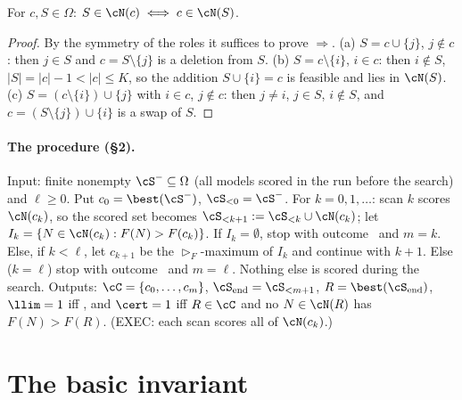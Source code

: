 \documentclass[11pt]{report}
\begin{document}
\begin{T20lemma}[symmetry]\label{T20:lem:sym}
For $c,S\in\Omega$: $S\in\cN(c)\iff c\in\cN(S)$.
\end{T20lemma}
\begin{proof}
By the symmetry of the roles it suffices to prove $\Rightarrow$. (a) $S=c\cup\{j\}$, $j\notin c$: then $j\in S$ and $c=S\setminus\{j\}$ is a deletion from $S$. (b) $S=c\setminus\{i\}$, $i\in c$: then $i\notin S$, $|S|=|c|-1<|c|\le K$, so the addition $S\cup\{i\}=c$ is feasible and lies in $\cN(S)$. (c) $S=(c\setminus\{i\})\cup\{j\}$ with $i\in c$, $j\notin c$: then $j\ne i$, $j\in S$, $i\notin S$, and $c=(S\setminus\{j\})\cup\{i\}$ is a swap of $S$.
\end{proof}

\paragraph{The procedure (\S2).} Input: finite nonempty $\cS^-\subseteq\Omega$ (all models scored in the run before the search) and $\ell\ge0$. Put $c_0=\best(\cS^-)$, $\cS_{<0}=\cS^-$. For $k=0,1,\dots$: scan $k$ scores $\cN(c_k)$, so the scored set becomes $\cS_{<k+1}:=\cS_{<k}\cup\cN(c_k)$; let $I_k=\{N\in\cN(c_k):F(N)>F(c_k)\}$. If $I_k=\emptyset$, stop with outcome \NOIMP\ and $m=k$. Else, if $k<\ell$, let $c_{k+1}$ be the $\rhd_F$-maximum of $I_k$ and continue with $k+1$. Else ($k=\ell$) stop with outcome \LIMIT\ and $m=\ell$. Nothing else is scored during the search. Outputs: $\cC=\{c_0,\dots,c_m\}$, $\cS_{\rm end}=\cS_{<m+1}$, $R=\best(\cS_{\rm end})$, $\llim=1$ iff \LIMIT, and $\cert=1$ iff $R\in\cC$ and no $N\in\cN(R)$ has $F(N)>F(R)$. (EXEC: each scan scores all of $\cN(c_k)$.)

\section{The basic invariant}
\end{document}
